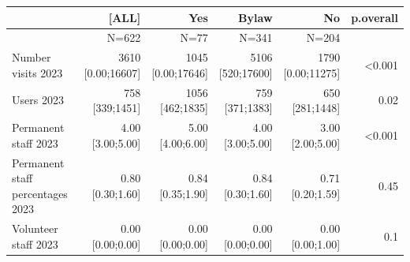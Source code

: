 \documentclass[a4paper,
fontsize=11pt,
oneside,
numbers=noperiodatend,
parskip=half-,
bibliography=totoc,
final
]{scrartcl}
\begin{document}
\begin{landscape}
\begin{table}[]\centering
\begin{tabular}{lrrrrr}
\hline
                                 & \textbf{{[}ALL{]}}       & \textbf{Yes}             & \textbf{Bylaw}           & \textbf{No}            & \textbf{p.overall} \\ \hline
                                 & N=622                    & N=77                     & N=341                    & N=204                  &                    \\ \hline
Number visits 2023               & \makecell{3610 \\ {[}0.00;16607{]}}    & \makecell{1045 \\ {[}0.00;17646{]}}    & \makecell{5106 \\ {[}520;17600{]}}     & \makecell{1790 \\ {[}0.00;11275{]}}  & \textless{}0.001   \\ \hline
Users 2023                       & \makecell{758 \\ {[}339;1451{]}}       & \makecell{1056 \\ {[}462;1835{]}}      & \makecell{759 \\ {[}371;1383{]}}       & \makecell{650 \\ {[}281;1448{]}}     & 0.02               \\ \hline
Permanent staff 2023             & \makecell{4.00 \\ {[}3.00;5.00{]}}     & \makecell{5.00 \\ {[}4.00;6.00{]}}     & \makecell{4.00 \\ {[}3.00;5.00{]}}     & \makecell{3.00 \\ {[}2.00;5.00{]}}   & \textless{}0.001   \\ \hline
Permanent staff percentages 2023 & \makecell{0.80 \\ {[}0.30;1.60{]}}     & \makecell{0.84 \\ {[}0.35;1.90{]}}     & \makecell{0.84 \\ {[}0.30;1.60{]}}     & \makecell{0.71 \\ {[}0.20;1.59{]}}   & 0.45               \\ \hline
Volunteer staff 2023             & \makecell{0.00 \\ {[}0.00;0.00{]}}     & \makecell{0.00 \\ {[}0.00;0.00{]}}     & \makecell{0.00 \\ {[}0.00;0.00{]}}     & \makecell{0.00 \\ {[}0.00;1.00{]}}   & 0.1                \\ \hline

\end{tabular}
\end{table}
\end{landscape}
\end{document}

